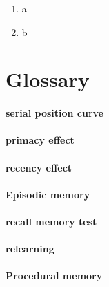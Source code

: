 \documentclass[
]{krantz}
\providecommand{\tightlist}{%
  \setlength{\itemsep}{0pt}\setlength{\parskip}{0pt}}
\begin{document}
\begin{enumerate}
\def\labelenumi{\arabic{enumi}.}
\tightlist
\item
  a
\item
  b
\end{enumerate}

\hypertarget{glossary-4}{%
\section{Glossary}\label{glossary-4}}

\hypertarget{serial-position-curve}{%
\paragraph*{serial position curve}\label{serial-position-curve}}

\hypertarget{primacy-effect}{%
\paragraph*{primacy effect}\label{primacy-effect}}

\hypertarget{recency-effect}{%
\paragraph*{recency effect}\label{recency-effect}}

\hypertarget{episodic-memory}{%
\paragraph*{Episodic memory}\label{episodic-memory}}

\hypertarget{recall-memory-test}{%
\paragraph*{recall memory test}\label{recall-memory-test}}

\hypertarget{relearning}{%
\paragraph*{relearning}\label{relearning}}

\hypertarget{procedural-memory}{%
\paragraph*{Procedural memory}\label{procedural-memory}}
\end{document}
